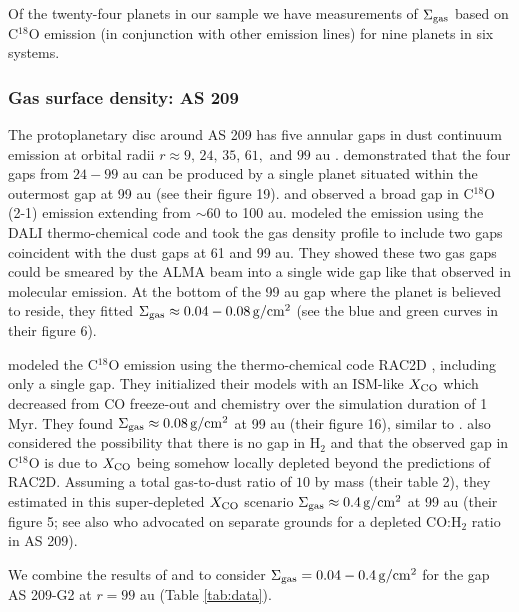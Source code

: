 \documentclass[fleqn,usenatbib]{mnras}
\newcommand{\Sigg}{\Sigma_{\rm gas}}
\newcommand{\gcm}{\rm g/cm^2}
\begin{document}
Of the twenty-four planets in our sample we have measurements of $\Sigg$ based on C$^{18}$O emission  (in conjunction with other emission lines) 
for nine 
planets in six systems.

\subsubsection{Gas surface density: AS 209}
\label{subsubsec:sigg_as209}

The protoplanetary disc around AS 209 has five annular gaps in dust continuum emission at orbital radii $r \approx 9,\,24,\,35,\,61,$ and $99$ au \citep{guzman_etal_2018, huang_etal_2018}. \cite{zhang_etal_2018} demonstrated that the four gaps from $24-99$ au can be produced by a single planet situated within the outermost gap at 99 au (see their figure 19). \cite{favre_etal_2019} and \cite{zhang_etal_2021} observed a broad gap in C$^{18}$O (2-1) emission extending from $\sim$60 to 100 au. 
\cite{favre_etal_2019} modeled the emission using the DALI thermo-chemical code \citep{bruderer_2013} and took the gas density profile to include two gaps coincident with the dust gaps at 61 and 99 au. They showed these two gas gaps could be smeared by the ALMA beam into a single wide gap like that observed in molecular emission. At the bottom of the 99 au gap where the planet is believed to reside, they fitted $\Sigg \approx 0.04-0.08\,\gcm$ (see the blue and green curves in their figure 6).

\cite{zhang_etal_2021} modeled the  C$^{18}$O emission using the thermo-chemical code RAC2D \citep{du_bergin_2014}, including only a single gap.
They initialized their models with an ISM-like $X_{\rm CO}$ which decreased from CO freeze-out and chemistry over the simulation duration of 1 Myr. They found $\Sigg \approx 0.08 \,\gcm$ at 99 au (their figure 16), similar to \cite{favre_etal_2019}. \cite{zhang_etal_2021} also considered the possibility that there is no gap in H$_2$ and that the observed gap in C$^{18}$O is due to $X_{\rm CO}$ being somehow locally depleted beyond the predictions of RAC2D. Assuming a total gas-to-dust ratio of $10$ by mass (their table 2), they estimated in this super-depleted $X_{\rm CO}$ scenario $\Sigg \approx 0.4 \,\gcm$ at 99 au (their figure 5; see also \citealt{alarcon_etal_2021} who advocated on separate grounds for a depleted CO:H$_2$ ratio in AS 209).

We combine the results of \cite{favre_etal_2019} and \cite{zhang_etal_2021} to consider $\Sigg = 0.04-0.4 \,\gcm$ for the gap AS 209-G2 at $r = 99$ au (Table \ref{tab:data}).
\end{document}
